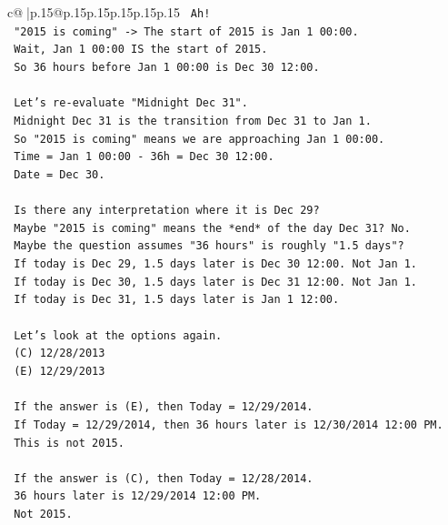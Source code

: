 \documentclass{article}
\begin{document}
{\begin{supertabular}{c@{$\;$}|p{.15\linewidth}@{}p{.15\linewidth}p{.15\linewidth}p{.15\linewidth}p{.15\linewidth}p{.15\linewidth}}
{{{\texttt{    Ah!} \\
\texttt{    "2015 is coming" {-}> The start of 2015 is Jan 1 00:00.} \\
\texttt{    Wait, Jan 1 00:00 IS the start of 2015.} \\
\texttt{    So 36 hours before Jan 1 00:00 is Dec 30 12:00.} \\
\\ 
\texttt{    Let's re{-}evaluate "Midnight Dec 31".} \\
\texttt{    Midnight Dec 31 is the transition from Dec 31 to Jan 1.} \\
\texttt{    So "2015 is coming" means we are approaching Jan 1 00:00.} \\
\texttt{    Time = Jan 1 00:00 {-} 36h = Dec 30 12:00.} \\
\texttt{    Date = Dec 30.} \\
\\ 
\texttt{    Is there any interpretation where it is Dec 29?} \\
\texttt{    Maybe "2015 is coming" means the *end* of the day Dec 31? No.} \\
\texttt{    Maybe the question assumes "36 hours" is roughly "1.5 days"?} \\
\texttt{    If today is Dec 29, 1.5 days later is Dec 30 12:00. Not Jan 1.} \\
\texttt{    If today is Dec 30, 1.5 days later is Dec 31 12:00. Not Jan 1.} \\
\texttt{    If today is Dec 31, 1.5 days later is Jan 1 12:00.} \\
\\ 
\texttt{    Let's look at the options again.} \\
\texttt{    (C) 12/28/2013} \\
\texttt{    (E) 12/29/2013} \\
\\ 
\texttt{    If the answer is (E), then Today = 12/29/2014.} \\
\texttt{    If Today = 12/29/2014, then 36 hours later is 12/30/2014 12:00 PM.} \\
\texttt{    This is not 2015.} \\
\\ 
\texttt{    If the answer is (C), then Today = 12/28/2014.} \\
\texttt{    36 hours later is 12/29/2014 12:00 PM.} \\
\texttt{    Not 2015.} \\
\\ 
}}}
\end{supertabular}}
\end{document}
